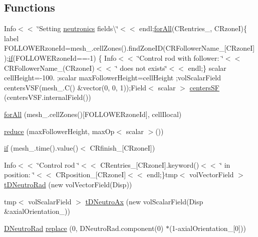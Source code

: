 \subsection*{Functions}
\begin{DoxyCompactItemize}
\item 
Info$<$$<$ \char`\"{}Setting \hyperlink{main_2include_2createFields_8H_aba4910c7964b6a522b7f0b911f652e9d}{neutronics} fields\textbackslash{}\char`\"{}$<$$<$ endl;\hyperlink{correctBoundaryFlux__2p_8H_a72582193b0ba782b35945b2502401afd}{for\+All}(C\+Rentries\+\_\+, C\+RzoneI)\{ label F\+O\+L\+L\+O\+W\+E\+Rzone\+Id=mesh\+\_\+.\+cell\+Zones().find\+Zone\+ID(C\+R\+Follower\+Name\+\_\+\mbox{[}C\+RzoneI\mbox{]});\hyperlink{writeOutput_8H_a2a235d7037ae617247c7c665f0cfa568}{if}(F\+O\+L\+L\+O\+W\+E\+Rzone\+Id==-\/1) \{ Info$<$$<$ \char`\"{}Control rod with follower\+: \char`\"{}$<$$<$ C\+R\+Follower\+Name\+\_\+(C\+RzoneI)$<$$<$ \char`\"{} does not exists\char`\"{}$<$$<$ endl;\} scalar cell\+Height=-\/100. ;scalar max\+Follower\+Height=cell\+Height ;vol\+Scalar\+Field centers\+V\+SF(mesh\+\_\+.\+C() \&vector(0, 0, 1));Field$<$ scalar $>$ \hyperlink{setNeutronicsVariablesLowMem_8H_a5db1e4741df8e4f4bf9d9c97cb5caebf}{centers\+SF} (centers\+V\+S\+F.\+internal\+Field())
\item 
\hyperlink{setNeutronicsVariablesLowMem_8H_a993e952d6495523347226445a7df4c16}{for\+All} (mesh\+\_\+.\+cell\+Zones()\mbox{[}F\+O\+L\+L\+O\+W\+E\+Rzone\+Id\mbox{]}, cell\+Ilocal)
\item 
\hyperlink{setNeutronicsVariablesLowMem_8H_af3234271aa5248f773a9631104c1f9e3}{reduce} (max\+Follower\+Height, max\+Op$<$ scalar $>$())
\item 
\hyperlink{setNeutronicsVariablesLowMem_8H_adc3ff83e9dbb8c2115415d1518ed18fc}{if} (mesh\+\_\+.\+time().value()$<$ C\+Rfinish\+\_\+\mbox{[}C\+RzoneI\mbox{]})
\item 
Info$<$$<$ \char`\"{}Control rod \char`\"{}$<$$<$ C\+Rentries\+\_\+\mbox{[}C\+RzoneI\mbox{]}.keyword()$<$$<$ \char`\"{} in position\+: \char`\"{}$<$$<$ C\+Rposition\+\_\+\mbox{[}C\+RzoneI\mbox{]}$<$$<$ endl;\}tmp$<$ vol\+Vector\+Field $>$ \hyperlink{setNeutronicsVariablesLowMem_8H_af987e7657f44458198bb766611f35673}{t\+D\+Neutro\+Rad} (new vol\+Vector\+Field(Disp))
\item 
tmp$<$ vol\+Scalar\+Field $>$ \hyperlink{setNeutronicsVariablesLowMem_8H_a4b681fea0e57309f57a1b08f367dcd60}{t\+D\+Neutro\+Ax} (new vol\+Scalar\+Field(Disp \&axial\+Orientation\+\_\+))
\item 
\hyperlink{setNeutronicsVariablesLowMem_8H_a87a8e73540cc64ca6321cea333ded9ac}{D\+Neutro\+Rad} \hyperlink{setNeutronicsVariablesLowMem_8H_ac63c673bca144ef7bb27f93a31b21ef3}{replace} (0, D\+Neutro\+Rad.\+component(0) $\ast$(1-\/axial\+Orientation\+\_\+\mbox{[}0\mbox{]}))
$$
\end{DoxyCompactItemize}
